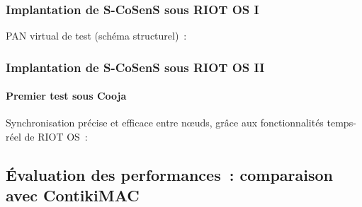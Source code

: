 \documentclass[10pt,c]{beamer}
\begin{document}
\begin{frame}[label=implSCoSenS1]
\frametitle{Implantation de S-CoSenS sous RIOT OS I}

PAN virtual de test (schéma structurel)~:
\vspace{-0.35cm}

\end{frame}

\begin{frame}[label=implSCoSenS2]
\frametitle{Implantation de S-CoSenS sous RIOT OS II}
\framesubtitle{Premier test sous Cooja}

Synchronisation précise et efficace entre n{\oe}uds, grâce aux
fonctionnalités temps-réel de RIOT OS~:

\end{frame}


\subsection{\'Evaluation des performances~: comparaison avec ContikiMAC}
\end{document}
